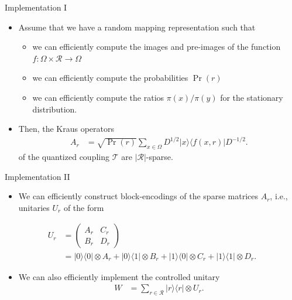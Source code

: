 \documentclass{beamer}
\renewcommand{\>}{\rangle}
\newcommand{\<}{\langle}
\newcommand{\cT}{\mathcal{T}}
\newcommand{\cR}{\mathcal{R}}
\begin{document}

\begin{frame}{Implementation I}
\begin{itemize}
\item Assume that we have a random mapping representation such that
\begin{itemize}
    \item we can efficiently compute the images and pre-images of the function $f : \Omega \times \cR \rightarrow \Omega$

    \medskip
    \item we can efficiently compute the probabilities $\Pr(r)$
    
    \medskip
    \item we can efficiently compute the ratios $\pi(x)/\pi(y)$ for the stationary distribution. 
\end{itemize}

\medskip
\item Then, the Kraus operators
\begin{align*}
    A_r 
    &= 
    \sqrt{\Pr(r)} \sum_{x\in\Omega} D^{1/2} |x\>\<f(x,r)| D^{-1/2}.
\end{align*}
of the quantized coupling $\cT$ are $|\cR|$-sparse. 

\end{itemize} 
\end{frame}


\begin{frame}{Implementation II}
\begin{itemize}
    \item We can efficiently construct block-encodings of the sparse matrices $A_r$, i.e., unitaries $U_r$ of the form
\end{itemize}
    \begin{align*}
        U_r
        &=
        \left(
        \begin{array}{cc}
            A_r & C_r \\
            B_r & D_r
        \end{array}
        \right) \\
        &=
        |0\>\<0| \otimes A_r +
        |0\>\<1| \otimes B_r +
        |1\>\<0| \otimes C_r +
        |1\>\<1| \otimes D_r.
    \end{align*}

\begin{itemize}
    \item We can also efficiently implement the controlled unitary
    \begin{align*}
        W 
        &=
        \sum_{r\in\cR} |r\>\<r| \otimes U_r.
    \end{align*}

\end{itemize}
\end{frame}
\end{document}

